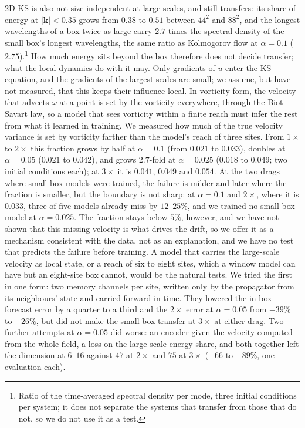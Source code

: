  2D KS is also not
size-independent at large scales, and still transfers: its share of
energy at $|\bm k|<0.35$ grows from $0.38$ to $0.51$ between $44^2$ and $88^2$,
and the longest wavelengths of a box twice as large carry
$2.7$ times the spectral density of the small box's longest
wavelengths, the same ratio as Kolmogorov flow at $\alpha=0.1$
($2.75$).\footnote{Ratio of the time-averaged spectral density per mode,
three initial conditions per system; it does not separate the systems
that transfer from those that do not, so we do not use it as a test.} How
much energy sits beyond the box therefore does not decide transfer; what
the local dynamics do with it may. Only gradients of $u$ enter the KS
equation, and the gradients of the largest scales are small; we assume,
but have not measured, that this keeps their influence local. In
vorticity form, the velocity that advects $\omega$ at a point is set by
the vorticity everywhere, through the Biot--Savart law, so a model that
sees vorticity within a finite reach must infer the rest from what it
learned in training. We measured how much of the true velocity variance
is set by vorticity farther than the model's reach of three sites. From
$1\times$ to $2\times$ this fraction grows by half at $\alpha=0.1$ (from $0.021$
to $0.033$), doubles at $\alpha=0.05$ ($0.021$ to $0.042$), and grows $2.7$-fold
at $\alpha=0.025$ ($0.018$ to $0.049$; two initial conditions
each); at $3\times$ it is $0.041$, $0.049$ and $0.054$. At the two drags where
small-box models were trained, the failure is milder and later where the
fraction is smaller, but the boundary is not sharp: at $\alpha=0.1$ and
$2\times$, where it is $0.033$, three of five models already miss by
$12$--$25\%$, and we trained no small-box model at $\alpha=0.025$. The fraction stays
below $5\%$, however, and we have not shown that this missing velocity is
what drives the drift, so we offer it as a mechanism consistent with the
data, not as an explanation, and we have no test that predicts the
failure before training. A model that carries the large-scale velocity as
local state, or a reach of six to eight sites, which a window model can
have but an eight-site box cannot, would be the natural tests. We tried the first in one form: two memory channels per
site, written only by the propagator from its neighbours' state and carried forward in time. They
lowered the in-box forecast error by a quarter to a third and the $2\times$ error at
$\alpha=0.05$ from $-39\%$ to $-26\%$, but did not make the small box transfer at $3\times$
at either drag. Two further attempts at $\alpha=0.05$ did worse: an encoder given the velocity
computed from the whole field, a loss on the large-scale energy share, and both together left the
dimension at $6$--$16$ against $47$ at $2\times$ and $75$ at $3\times$ ($-66$ to $-89\%$, one
evaluation each).

